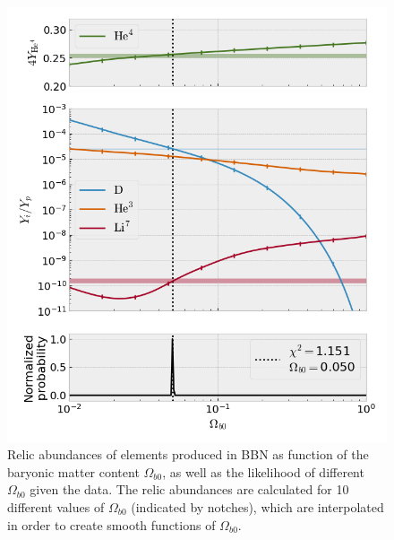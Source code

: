 \documentclass[reprint,english,notitlepage]{revtex4-1}  %
\numberwithin{equation}{section}
\begin{document}
\begin{figure}[h]
	\includegraphics[width=\columnwidth]{relic_abundances_j.png}
	\caption{Relic abundances of elements produced in BBN as function of the baryonic
					matter content $\Omega_{b0}$, as well as the likelihood of different
					$\Omega_{b0}$ given the data. The relic abundances are calculated for
					10 different values of $\Omega_{b0}$ (indicated by notches), which are
					interpolated in order to create smooth functions of $\Omega_{b0}$.}
	\label{fig:problem_j}
\end{figure}
\end{document}

